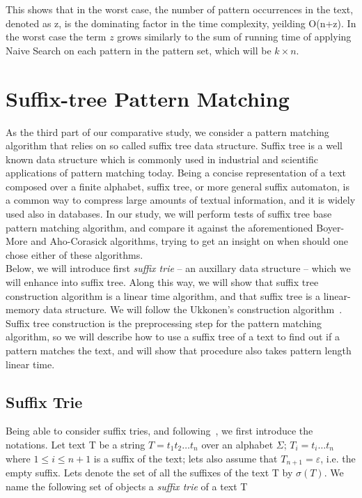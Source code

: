 \documentclass[paper=a4, fontsize=11pt]{scrartcl} %
\numberwithin{equation}{section} %
\numberwithin{figure}{section} %
\numberwithin{table}{section} %
\begin{document}
This shows that in the worst case, the number of pattern occurrences in the text, denoted as z, is the dominating factor in the time complexity, yeilding O(n+z). In the worst case the term $z$ grows similarly to the sum of running time of applying Naive Search on each pattern in the pattern set, which will be $k\times n$.



\newpage

\section{Suffix-tree Pattern Matching}
As the third part of our comparative study, we consider a pattern matching algorithm that relies on so called suffix tree data structure. Suffix tree is a well known data structure which is commonly used in industrial and scientific applications of pattern matching today. Being a concise representation of a text composed over a finite alphabet, suffix tree, or more general suffix automaton, is a common way to compress large amounts of textual information, and it is widely used also in databases. In our study, we will perform tests of suffix tree base pattern matching algorithm, and compare it against the aforementioned Boyer-More and Aho-Corasick algorithms, trying to get an insight on when should one chose either of these algorithms.\\

Below, we will introduce first \textit{suffix trie} -- an auxillary data structure -- which we will enhance into suffix tree. Along this way, we will show that suffix tree construction algorithm is a linear time algorithm, and that suffix tree is a linear-memory data structure. We will follow the Ukkonen's construction algorithm~\cite{ukkonen1995line}. Suffix tree construction is the preprocessing step for the pattern matching algorithm, so we will describe how to use a suffix tree of a text to find out if a pattern matches the text, and will show that procedure also takes pattern length linear time.

\subsection{Suffix Trie}
Being able to consider suffix tries, and following~\cite{ukkonen1995line}, we first introduce the notations. Let text T be a string $T = t_1 t_2 \dots t_n$ over an alphabet $\Sigma$; $T_i = t_i \dots t_n$ where $1 \leq i \leq n+1$ is a suffix of the text; lets also assume that $T_{n+1} = \varepsilon$, i.e. the empty suffix. Lets denote the set of all the suffixes of the text T by $\sigma(T)$. We name the following set of objects a \textit{suffix trie} of a text T
\end{document}

